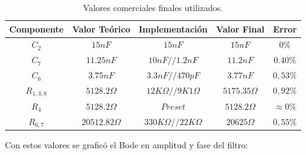 \begin{table}[H]
\centering
\begin{tabular}{@{}ccccc@{}}
\toprule
Componente & Valor Teórico & Implementación & Valor Final & Error \\ \midrule
$C_2$ & $15nF$ & $15nF$ & $15nF$ & $0\%$ \\
$C_7$ & $11.25nF$ & $10nF//1.2nF$ & $11.2nF$ & $0.40\%$ \\
$C_6$ & $3.75nF$ & $3.3nF//470pF$ & $3.77nF$ & $0,53\%$\\
$R_{1,3,8}$ & $5128.2 \Omega$ & $12K\Omega//9K1\Omega$ & $5175.35 \Omega$ & $0,92\%$ \\
$R_4$ & $5128.2 \Omega$ & $Preset$ & $5128.2 \Omega$ & $\approx 0\%$\\
$R_{6,7}$ & $20512.82 \Omega$ & $330K\Omega//22K\Omega$ & $20625\Omega$ & $0,55\%$ \\ \bottomrule
\end{tabular}
\caption{Valores comerciales finales utilizados.}
\label{Tab:valores}
\end{table}

Con estos valores se graficó el Bode en amplitud y fase del filtro:

